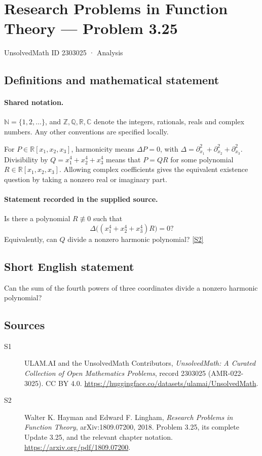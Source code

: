 \documentclass[11pt]{book}
\newcommand{\sref}[2]{\hyperlink{source:#1:#2}{[S#2]}}
\begin{document}
\setcounter{section}{2303024}
\section{Research Problems in Function Theory — Problem 3.25}\label{2303025}
{\small\sffamily UnsolvedMath ID 2303025 · Analysis}
\subsection{Definitions and mathematical statement}

\paragraph{Shared notation.}$\mathbb N=\{1,2,\ldots\}$, and $\mathbb Z,\mathbb Q,\mathbb R,\mathbb C$ denote the integers, rationals, reals and complex numbers. Any other conventions are specified locally.


For $P\in\mathbb R[x_1,x_2,x_3]$, harmonicity means $\Delta P=0$, with $\Delta=\partial_{x_1}^2+\partial_{x_2}^2+\partial_{x_3}^2$. Divisibility by $Q=x_1^4+x_2^4+x_3^4$ means that $P=QR$ for some polynomial $R\in\mathbb R[x_1,x_2,x_3]$. Allowing complex coefficients gives the equivalent existence question by taking a nonzero real or imaginary part.
\paragraph{Statement recorded in the supplied source.}
Is there a polynomial $R\not\equiv0$ such that
\[\Delta\bigl((x_1^4+x_2^4+x_3^4)R\bigr)=0?\]
Equivalently, can $Q$ divide a nonzero harmonic polynomial? \sref{2303025}{2}
\subsection{Short English statement}
Can the sum of the fourth powers of three coordinates divide a nonzero harmonic polynomial?
\subsection{Sources}
\begin{description}
\item[\hypertarget{source:2303025:1}{S1}] ULAM.AI and the UnsolvedMath Contributors, \emph{UnsolvedMath: A Curated Collection of Open Mathematics Problems}, record 2303025 (AMR-022-3025). CC BY 4.0. \url{https://huggingface.co/datasets/ulamai/UnsolvedMath}.
\item[\hypertarget{source:2303025:2}{S2}] Walter K. Hayman and Edward F. Lingham, \emph{Research Problems in Function Theory}, arXiv:1809.07200, 2018. Problem 3.25, its complete Update 3.25, and the relevant chapter notation. \url{https://arxiv.org/pdf/1809.07200}.
\end{description}
\label{end:2303025}
\end{document}
